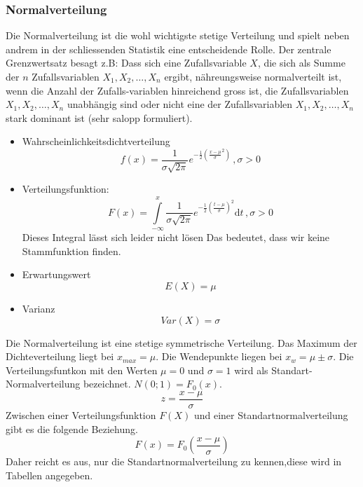 \subsubsection{Normalverteilung}\label{theorie:normalverteilung}
Die Normalverteilung ist die wohl wichtigste stetige Verteilung und spielt neben andrem in der schliessenden Statistik eine entscheidende Rolle. Der zentrale Grenzwertsatz besagt z.B: Dass sich eine Zufallsvariable $X$, die sich als Summe der $n$ Zufallsvariablen $X_1, X_2, \ldots, X_n$ ergibt, nähreungsweise normalverteilt ist, wenn die Anzahl der Zufalls-variablen hinreichend gross ist, die Zufallsvariablen $X_1, X_2,\ldots , X_n$ unabhängig sind oder nicht eine der Zufallsvariablen $X_1, X_2, \ldots ,X_n$ stark dominant ist (sehr salopp formuliert).
\begin{itemize}
	\item Wahrscheinlichkeitsdichtverteilung
	\begin{equation}
	f(x) = \frac{1}{\sigma\sqrt{2\pi}}e^{-\frac{1}{2}\left(\frac{x-\mu}{\sigma}^{2}\right)}\, , \sigma > 0
	\end{equation}
	\item Verteilungsfunktion:
	\begin{equation}
	F(x) = \int\limits_{-\infty}^{x}\frac{1}{\sigma\sqrt{2\pi}}e^{-\frac{1}{2}\left(\frac{t-\mu}{\sigma}\right)^2}\mathrm{d}t\, ,\sigma > 0
	\end{equation}
	Dieses Integral lässt sich leider nicht lösen Das bedeutet, dass wir keine Stammfunktion finden.
	\item Erwartungswert
	\begin{equation}
	E(X) = \mu
	\end{equation}
	\item Varianz
	\begin{equation}
	Var(X) = \sigma
	\end{equation}
\end{itemize}
Die Normalverteilung ist eine stetige symmetrische Verteilung. Das Maximum der Dichteverteilung liegt bei $x_{max}=\mu$. Die Wendepunkte liegen bei $x_w=\mu\pm\sigma$. Die Verteilungsfuntkon mit den Werten $\mu=0$ und $\sigma=1$ wird als Standart-Normalverteilung bezeichnet. $N(0;1)=F_0(x)$.
\begin{equation}
z=\frac{x-\mu}{\sigma}
\end{equation}
Zwischen einer Verteilungsfunktion $F(X)$ und einer Standartnormalverteilung gibt es die folgende Beziehung.
\begin{equation}
F(x)=F_0\left(\frac{x-\mu}{\sigma}\right)
\end{equation}
Daher reicht es aus, nur die Standartnormalverteilung zu kennen,diese wird in Tabellen angegeben.
